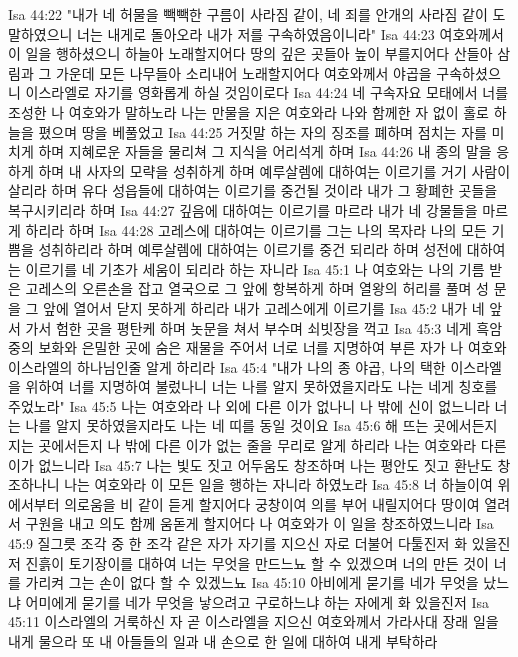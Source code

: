 Isa 44:22  "내가 네 허물을 빽빽한 구름이 사라짐 같이, 네 죄를 안개의 사라짐 같이 도말하였으니 너는 내게로 돌아오라 내가 저를 구속하였음이니라"
Isa 44:23  여호와께서 이 일을 행하셨으니 하늘아 노래할지어다 땅의 깊은 곳들아 높이 부를지어다 산들아 삼림과 그 가운데 모든 나무들아 소리내어 노래할지어다 여호와께서 야곱을 구속하셨으니 이스라엘로 자기를 영화롭게 하실 것임이로다
Isa 44:24  네 구속자요 모태에서 너를 조성한 나 여호와가 말하노라 나는 만물을 지은 여호와라 나와 함께한 자 없이 홀로 하늘을 폈으며 땅을 베풀었고
Isa 44:25  거짓말 하는 자의 징조를 폐하며 점치는 자를 미치게 하며 지혜로운 자들을 물리쳐 그 지식을 어리석게 하며
Isa 44:26  내 종의 말을 응하게 하며 내 사자의 모략을 성취하게 하며 예루살렘에 대하여는 이르기를 거기 사람이 살리라 하며 유다 성읍들에 대하여는 이르기를 중건될 것이라 내가 그 황폐한 곳들을 복구시키리라 하며
Isa 44:27  깊음에 대하여는 이르기를 마르라 내가 네 강물들을 마르게 하리라 하며
Isa 44:28  고레스에 대하여는 이르기를 그는 나의 목자라 나의 모든 기쁨을 성취하리라 하며 예루살렘에 대하여는 이르기를 중건 되리라 하며 성전에 대하여는 이르기를 네 기초가 세움이 되리라 하는 자니라
Isa 45:1  나 여호와는 나의 기름 받은 고레스의 오른손을 잡고 열국으로 그 앞에 항복하게 하며 열왕의 허리를 풀며 성 문을 그 앞에 열어서 닫지 못하게 하리라 내가 고레스에게 이르기를
Isa 45:2  내가 네 앞서 가서 험한 곳을 평탄케 하며 놋문을 쳐서 부수며 쇠빗장을 꺽고
Isa 45:3  네게 흑암 중의 보화와 은밀한 곳에 숨은 재물을 주어서 너로 너를 지명하여 부른 자가 나 여호와 이스라엘의 하나님인줄 알게 하리라
Isa 45:4  "내가 나의 종 야곱, 나의 택한 이스라엘을 위하여 너를 지명하여 불렀나니 너는 나를 알지 못하였을지라도 나는 네게 칭호를 주었노라"
Isa 45:5  나는 여호와라 나 외에 다른 이가 없나니 나 밖에 신이 없느니라 너는 나를 알지 못하였을지라도 나는 네 띠를 동일 것이요
Isa 45:6  해 뜨는 곳에서든지 지는 곳에서든지 나 밖에 다른 이가 없는 줄을 무리로 알게 하리라 나는 여호와라 다른이가 없느니라
Isa 45:7  나는 빛도 짓고 어두움도 창조하며 나는 평안도 짓고 환난도 창조하나니 나는 여호와라 이 모든 일을 행하는 자니라 하였노라
Isa 45:8  너 하늘이여 위에서부터 의로움을 비 같이 듣게 할지어다 궁창이여 의를 부어 내릴지어다 땅이여 열려서 구원을 내고 의도 함께 움돋게 할지어다 나 여호와가 이 일을 창조하였느니라
Isa 45:9  질그릇 조각 중 한 조각 같은 자가 자기를 지으신 자로 더불어 다툴진저 화 있을진저 진흙이 토기장이를 대하여 너는 무엇을 만드느뇨 할 수 있겠으며 너의 만든 것이 너를 가리켜 그는 손이 없다 할 수 있겠느뇨
Isa 45:10  아비에게 묻기를 네가 무엇을 났느냐 어미에게 묻기를 네가 무엇을 낳으려고 구로하느냐 하는 자에게 화 있을진저
Isa 45:11  이스라엘의 거룩하신 자 곧 이스라엘을 지으신 여호와께서 가라사대 장래 일을 내게 물으라 또 내 아들들의 일과 내 손으로 한 일에 대하여 내게 부탁하라

